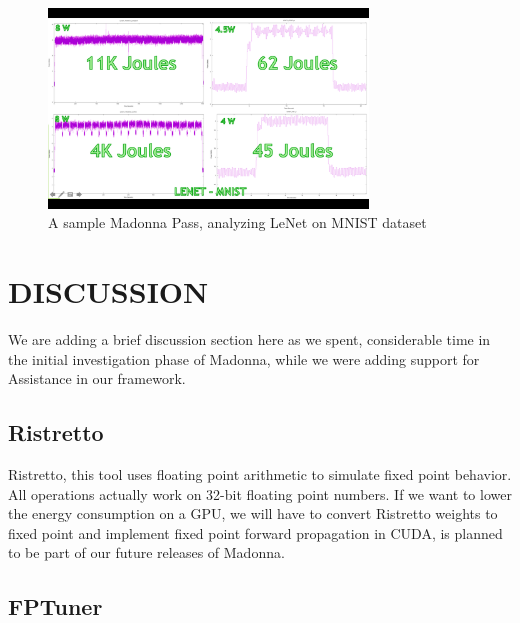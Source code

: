 \documentclass[letterpaper, 10 pt, conference]{ieeeconf}
\begin{document}
          \begin{figure}[h]
              \centering
              \includegraphics[width=85mm,scale=1]{lenet.png}
              \caption{A sample Madonna Pass, analyzing LeNet on MNIST dataset}
              \label{fig:lenet}
          \end{figure}


\section{DISCUSSION}

We are adding a brief discussion section here as we spent, considerable time in the initial 
investigation phase of Madonna, while we were adding support for Assistance in our framework.

\subsection{Ristretto} Ristretto, this tool uses floating point arithmetic to simulate
fixed point behavior. 
All operations actually work on 32-bit floating point numbers.
If we want to lower the energy consumption on a GPU, we will have to convert Ristretto
weights to fixed point and implement fixed point forward propagation in CUDA, is planned to be
part of our future releases of Madonna.

\subsection{FPTuner}
\end{document}
